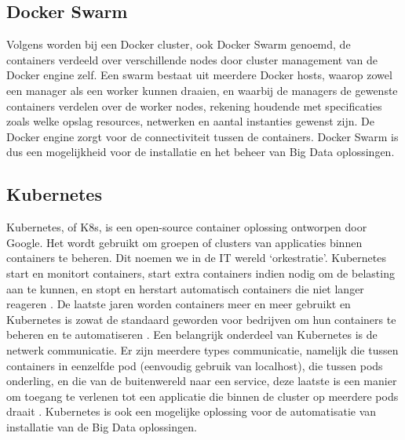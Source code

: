 \subsection{Docker Swarm}
Volgens \textcite{Docker2023b} worden bij een Docker cluster, ook Docker Swarm genoemd, de containers verdeeld over verschillende nodes door cluster management van de Docker engine zelf. Een swarm bestaat uit meerdere Docker hosts, waarop zowel een manager als een worker kunnen draaien, en waarbij de managers de gewenste containers verdelen over de worker nodes, rekening houdende met specificaties zoals welke opslag resources, netwerken en aantal instanties gewenst zijn. De Docker engine zorgt voor de connectiviteit tussen de containers.
\newline
\newline
Docker Swarm is dus een mogelijkheid voor de installatie en het beheer van Big Data oplossingen.
\newline
\newline

\subsection{Kubernetes}
Kubernetes, of K8s, is een open-source container oplossing ontworpen door Google. Het wordt gebruikt om groepen of clusters van applicaties binnen containers te beheren. Dit noemen we in de IT wereld ‘orkestratie’.
\newline
Kubernetes start en monitort containers, start extra containers indien nodig om de belasting aan te kunnen, en stopt en herstart automatisch containers die niet langer reageren \autocite{Guthrie2022}.
\newline
\newline
De laatste jaren worden containers meer en meer gebruikt en Kubernetes is zowat de standaard geworden voor bedrijven om hun containers te beheren en te automatiseren \autocite{Razorops2022}.
\newline
\newline
Een belangrijk onderdeel van Kubernetes is de netwerk communicatie. Er zijn meerdere types communicatie, namelijk die tussen containers in eenzelfde pod (eenvoudig gebruik van localhost), die tussen pods onderling, en die van de buitenwereld naar een service, deze laatste is een manier om toegang te verlenen tot een applicatie die binnen de cluster op meerdere pods draait \autocite{Kubernetes2023a} \autocite{Kubernetes2023b}.
\newline
\newline
Kubernetes is ook een mogelijke oplossing voor de automatisatie van installatie van de Big Data oplossingen.



